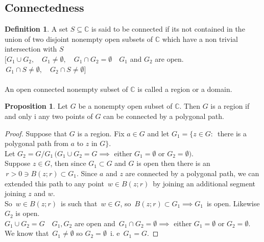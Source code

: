\documentclass[11pt,a4paper]{article}
\theoremstyle{definition}
\newtheorem{definition}[thm]{Definition}
\newtheorem{proposition}[thm]{Proposition}
\begin{document}
{\color[wave]{485}\subsection{Connectedness}}

\begin{definition}
A set $S\subseteq \mathbb{C}$ is said to be connected if its not contained in the union of two disjoint nonempty open subsets of $\mathbb{C}$ which have a non trivial intersection with $S$\\


$\big[ G_1 \cup G_2,\quad  G_1\neq \emptyset, \quad  G_1\cap G_2 = \emptyset\quad G_1$ and $G_2$ are open. $\, G_1\cap S \neq \emptyset,\quad  G_2\cap S \neq \emptyset\big]$\\\\












An open connected nonempty subset of $\mathbb{C}$ is called a region or a domain.
\end{definition}

\begin{proposition}
Let $G$ be a nonempty open subset of $\mathbb{C}$. Then $G$ is a region if and only i any two points of $G$ can be connected by a polygonal path.
\end{proposition}

\begin{proof}

Suppose that $G$ is a region. Fix $a\in G$ and let $G_1 = \big\{z\in G:\,$ there is a polygonal path from $a$ to $z$ in $G\big\}$.\\
Let $G_2 = G/G_1\, (G_1\cup G_2 = G \implies$ either $G_1 = \emptyset$ or $G_2 = \emptyset)$.\\
Suppose $z\in G$, then since $G_1\subset G$ and $G$ is open then there is  an $\, r> 0 \ni B(z;r)\subset G_1$. Since $a$ and $z$ are connected by a polygonal path, we can extended this path to any point $\, w \in B(z; r)\,$ by joining an additional segment joining $z$ and $w$.\\
So $\,w \in B(z; r)\,$ is such that $\, w \in G$, so $\, B(z; r) \subset G_1 \implies G_1\,$ is open. Likewise $G_2$ is open.\\
$G_1\cup G_2 = G\quad  G_1, G_2$ are open and $\, G_1\cap G_2 = \emptyset \implies$ either $G_1 = \emptyset$ or $G_2 = \emptyset$. We know that $\, G_1 \neq \emptyset$ so $G_2 = \emptyset\,$ i. e $\, G_1 = G$.
\end{proof}
\end{document}

